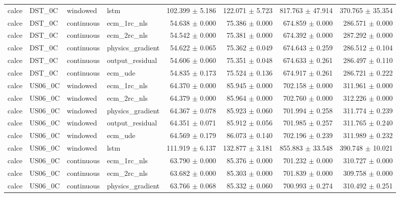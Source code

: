 \begin{longtable}{llllrrrr}
calce & DST\_0C & windowed & lstm & 102.399 $\pm$ 5.186 & 122.071 $\pm$ 5.723 & 817.763 $\pm$ 47.914 & 370.765 $\pm$ 35.354 \\
calce & DST\_0C & continuous & ecm\_1rc\_nls & 54.638 $\pm$ 0.000 & 75.386 $\pm$ 0.000 & 674.859 $\pm$ 0.000 & 286.571 $\pm$ 0.000 \\
calce & DST\_0C & continuous & ecm\_2rc\_nls & 54.542 $\pm$ 0.000 & 75.381 $\pm$ 0.000 & 674.392 $\pm$ 0.000 & 287.292 $\pm$ 0.000 \\
calce & DST\_0C & continuous & physics\_gradient & 54.622 $\pm$ 0.065 & 75.362 $\pm$ 0.049 & 674.643 $\pm$ 0.259 & 286.512 $\pm$ 0.104 \\
calce & DST\_0C & continuous & output\_residual & 54.606 $\pm$ 0.060 & 75.351 $\pm$ 0.048 & 674.633 $\pm$ 0.261 & 286.497 $\pm$ 0.110 \\
calce & DST\_0C & continuous & ecm\_ude & 54.835 $\pm$ 0.173 & 75.524 $\pm$ 0.136 & 674.917 $\pm$ 0.261 & 286.721 $\pm$ 0.222 \\
calce & US06\_0C & windowed & ecm\_1rc\_nls & 64.370 $\pm$ 0.000 & 85.945 $\pm$ 0.000 & 702.158 $\pm$ 0.000 & 311.961 $\pm$ 0.000 \\
calce & US06\_0C & windowed & ecm\_2rc\_nls & 64.379 $\pm$ 0.000 & 85.964 $\pm$ 0.000 & 702.760 $\pm$ 0.000 & 312.226 $\pm$ 0.000 \\
calce & US06\_0C & windowed & physics\_gradient & 64.367 $\pm$ 0.078 & 85.923 $\pm$ 0.060 & 701.994 $\pm$ 0.258 & 311.774 $\pm$ 0.239 \\
calce & US06\_0C & windowed & output\_residual & 64.351 $\pm$ 0.071 & 85.912 $\pm$ 0.056 & 701.985 $\pm$ 0.257 & 311.765 $\pm$ 0.240 \\
calce & US06\_0C & windowed & ecm\_ude & 64.569 $\pm$ 0.179 & 86.073 $\pm$ 0.140 & 702.196 $\pm$ 0.239 & 311.989 $\pm$ 0.232 \\
calce & US06\_0C & windowed & lstm & 111.919 $\pm$ 6.137 & 132.877 $\pm$ 3.181 & 855.883 $\pm$ 33.548 & 390.748 $\pm$ 10.021 \\
calce & US06\_0C & continuous & ecm\_1rc\_nls & 63.790 $\pm$ 0.000 & 85.376 $\pm$ 0.000 & 701.232 $\pm$ 0.000 & 310.727 $\pm$ 0.000 \\
calce & US06\_0C & continuous & ecm\_2rc\_nls & 63.682 $\pm$ 0.000 & 85.303 $\pm$ 0.000 & 701.839 $\pm$ 0.000 & 309.758 $\pm$ 0.000 \\
calce & US06\_0C & continuous & physics\_gradient & 63.766 $\pm$ 0.068 & 85.332 $\pm$ 0.060 & 700.993 $\pm$ 0.274 & 310.492 $\pm$ 0.251 \\

\end{longtable}
